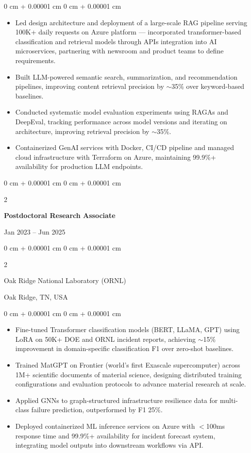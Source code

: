 \documentclass[10pt, letterpaper]{article}
\newenvironment{highlights}{
    \begin{itemize}[
        topsep=0.10 cm,
        parsep=0.10 cm,
        partopsep=0pt,
        itemsep=0pt,
        leftmargin=0 cm + 10pt
    ]
}{
    \end{itemize}
} %
\newenvironment{onecolentry}{
    \begin{adjustwidth}{
        0 cm + 0.00001 cm
    }{
        0 cm + 0.00001 cm
    }
}{
    \end{adjustwidth}
} %
\newenvironment{twocolentry}[2][]{
    \onecolentry
    \def\secondColumn{#2}
    \setcolumnwidth{\fill, 4.5 cm}
    \begin{paracol}{2}
}{
    \switchcolumn \raggedleft \secondColumn
    \end{paracol}
    \endonecolentry
} %
\begin{document}
    \begin{onecolentry}
        \begin{highlights}
            \item Led design architecture and deployment of a large-scale RAG pipeline serving 100K+ daily requests on Azure platform — incorporated transformer-based classification and retrieval models through APIs integration into AI microservices, partnering with newsroom and product teams to define requirements.
            \item Built LLM-powered semantic search, summarization, and recommendation pipelines, improving content retrieval precision by $\sim$35\% over keyword-based baselines.
            \item Conducted systematic model evaluation experiments using RAGAs and DeepEval, tracking performance across model versions and iterating on architecture, improving retrieval precision by $\sim$35\%.
            \item Containerized GenAI services with Docker, CI/CD pipeline and managed cloud infrastructure with Terraform on Azure, maintaining 99.9\%+ availability for production LLM endpoints.
        \end{highlights}
    \end{onecolentry}

\vspace{1mm}

    \begin{twocolentry}{Jan 2023 -- Jun 2025}
        \textbf{Postdoctoral Research Associate}
    \end{twocolentry}
    \begin{twocolentry}{Oak Ridge, TN, USA}
        Oak Ridge National Laboratory (ORNL)
    \end{twocolentry}
    \vspace{0.10 cm}
    \begin{onecolentry}
        \begin{highlights}
            \item Fine-tuned Transformer classification models (BERT, LLaMA, GPT) using LoRA on 50K+ DOE and ORNL incident reports, achieving $\sim$15\% improvement in domain-specific classification F1 over zero-shot baselines.
            \item Trained MatGPT on Frontier (world’s first Exascale supercomputer) across 1M+ scientific documents of material science, designing distributed training configurations and evaluation protocols to advance material research at scale.
            \item Applied GNNs to graph-structured infrastructure resilience data for multi-class failure prediction, outperformed by F1 25\%.
            \item Deployed containerized ML inference services on Azure with $<$100ms response time and 99.9\%+ availability for incident forecast system, integrating model outputs into downstream workflows via API.
        \end{highlights}
    \end{onecolentry}
\end{document}
